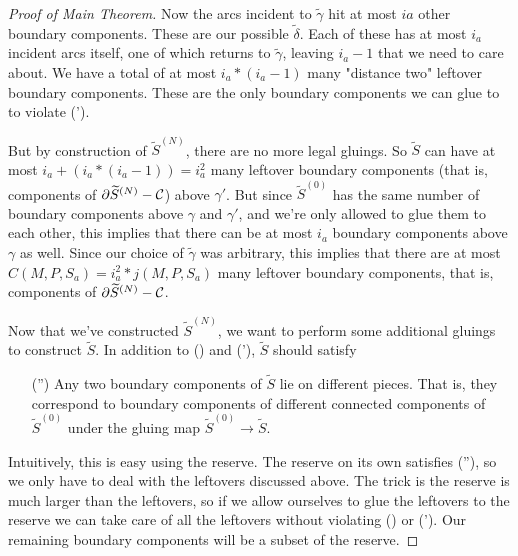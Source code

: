 \begin{proof}[Proof of Main Theorem]
Now the arcs incident to $\widetilde{\gamma}$ hit at most $ia$ other boundary
components. These are our possible $\widetilde{\delta}$. Each of these has at
most $i_a$ incident arcs itself, one of which returns to $\widetilde{\gamma}$,
leaving $i_a-1$ that we need to care about. We have a total of at most
$i_a*(i_a-1)$ many "distance two" leftover boundary components. These are the
only boundary components we can glue to to violate (\dag').

But by construction of $\widetilde{S}^{(N)}$, there are no more legal gluings. So
$\widetilde{S}$ can have at most $i_a+(i_a*(i_a-1)) = i_a^2$ many leftover boundary
components (that is, components of $\partial\widetilde{S}^{(N)}-\mathcal{C}$) above $\gamma'$.  But since
$\widetilde{S}^{(0)}$ has the same number of boundary components above $\gamma$ and
$\gamma'$, and we're only allowed to glue them to each other, this implies that
there can be at most $i_a$ boundary components above $\gamma$ as well.  Since
our choice of $\widetilde{\gamma}$ was arbitrary, this implies that there are
at most $C(M,P,S_a) = i_a^2*j(M,P,S_a)$ many leftover boundary components, that
is, components of $\partial\widetilde{S}^{(N)}-\mathcal{C}$.


Now that we've constructed $\widetilde{S}^{(N)}$, we want to perform some additional
gluings to construct $\widetilde{S}$. In addition to (\dag) and (\dag'), $\widetilde{S}$ should
satisfy

\begin{enumerate}

\item[(\dag'')] Any two boundary components of $\widetilde{S}$ lie on different
pieces. That is, they correspond to boundary components of different connected
components of $\widetilde{S}^{(0)}$ under the gluing map $\widetilde{S}^{(0)}
\to \widetilde{S}$.

\end{enumerate}

Intuitively, this is easy using the reserve. The reserve on its own satisfies
(\dag''), so we only have to deal with the leftovers discussed above.  The trick
is the reserve is much larger than the leftovers, so if we allow ourselves to
glue the leftovers to the reserve we can take care of all the leftovers without
violating (\dag) or (\dag'). Our remaining boundary components will be a subset
of the reserve.


\end{proof}
